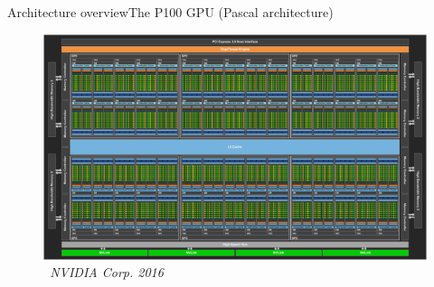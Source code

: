 \documentclass[aspectratio=169,12pt]{beamer}
\begin{document}
\begin{frame}{Architecture overview}{The P100 GPU (Pascal architecture)}
  \begin{figure}
    \centering
    \includegraphics[scale=.9]{p100_arch.png} \\
    \emph{\scriptsize\textcopyright\ NVIDIA Corp. 2016}
  \end{figure}
\end{frame}
\end{document}
